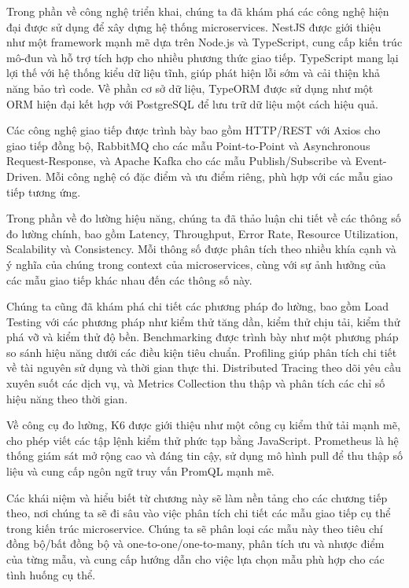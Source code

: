 Trong phần về công nghệ triển khai, chúng ta đã khám phá các công nghệ hiện đại được sử dụng để xây dựng hệ thống microservices. NestJS được giới thiệu như một framework mạnh mẽ dựa trên Node.js và TypeScript, cung cấp kiến trúc mô-đun và hỗ trợ tích hợp cho nhiều phương thức giao tiếp. TypeScript mang lại lợi thế với hệ thống kiểu dữ liệu tĩnh, giúp phát hiện lỗi sớm và cải thiện khả năng bảo trì code. Về phần cơ sở dữ liệu, TypeORM được sử dụng như một ORM hiện đại kết hợp với PostgreSQL để lưu trữ dữ liệu một cách hiệu quả.

Các công nghệ giao tiếp được trình bày bao gồm HTTP/REST với Axios cho giao tiếp đồng bộ, RabbitMQ cho các mẫu Point-to-Point và Asynchronous Request-Response, và Apache Kafka cho các mẫu Publish/Subscribe và Event-Driven. Mỗi công nghệ có đặc điểm và ưu điểm riêng, phù hợp với các mẫu giao tiếp tương ứng.

Trong phần về đo lường hiệu năng, chúng ta đã thảo luận chi tiết về các thông số đo lường chính, bao gồm Latency, Throughput, Error Rate, Resource Utilization, Scalability và Consistency. Mỗi thông số được phân tích theo nhiều khía cạnh và ý nghĩa của chúng trong context của microservices, cùng với sự ảnh hưởng của các mẫu giao tiếp khác nhau đến các thông số này.

Chúng ta cũng đã khám phá chi tiết các phương pháp đo lường, bao gồm Load Testing với các phương pháp như kiểm thử tăng dần, kiểm thử chịu tải, kiểm thử phá vỡ và kiểm thử độ bền. Benchmarking được trình bày như một phương pháp so sánh hiệu năng dưới các điều kiện tiêu chuẩn. Profiling giúp phân tích chi tiết về tài nguyên sử dụng và thời gian thực thi. Distributed Tracing theo dõi yêu cầu xuyên suốt các dịch vụ, và Metrics Collection thu thập và phân tích các chỉ số hiệu năng theo thời gian.

Về công cụ đo lường, K6 được giới thiệu như một công cụ kiểm thử tải mạnh mẽ, cho phép viết các tập lệnh kiểm thử phức tạp bằng JavaScript. Prometheus là hệ thống giám sát mở rộng cao và đáng tin cậy, sử dụng mô hình pull để thu thập số liệu và cung cấp ngôn ngữ truy vấn PromQL mạnh mẽ.

Các khái niệm và hiểu biết từ chương này sẽ làm nền tảng cho các chương tiếp theo, nơi chúng ta sẽ đi sâu vào việc phân tích chi tiết các mẫu giao tiếp cụ thể trong kiến trúc microservice. Chúng ta sẽ phân loại các mẫu này theo tiêu chí đồng bộ/bất đồng bộ và one-to-one/one-to-many, phân tích ưu và nhược điểm của từng mẫu, và cung cấp hướng dẫn cho việc lựa chọn mẫu phù hợp cho các tình huống cụ thể.

